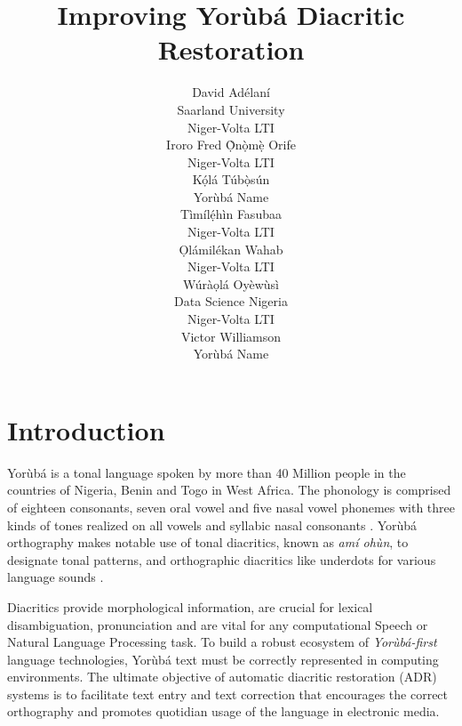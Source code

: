 \documentclass{article} %
\title{Improving Yor{\`u}b{\'a} Diacritic Restoration}
\author{David Ad{\'e}lan{\'i} \\
Saarland University\\
Niger-Volta LTI \\
\And
Iroro Fred \d{\`O}n\d{\`o}m\d{\`e} Orife \\
Niger-Volta LTI\\
\And
K\d{\'{o}}l\'{a} T\'{u}b\d{\`{o}}s\'{u}n \\
Yor{\`u}b{\'a} Name \\
\And
T{\`i}m{\'i}l\d{\'{e}}h{\`i}n Fasubaa \\
Niger-Volta LTI \\
\And
\d{O}l{\'a}mil{\'e}kan Wahab \\
Niger-Volta LTI \\
\And
W{\'u}r{\`a}\d{o}l{\'a} Oy{\`e}w{\`u}s{\`i} \\
Data Science Nigeria \\
Niger-Volta LTI \\
\And
Victor Williamson \\
Yor{\`u}b{\'a} Name \\
}
\begin{document}
\maketitle


\section{Introduction}\label{sec:introduction}

Yor{\`u}b{\'a} is a tonal language spoken by more than 40 Million people in the countries of Nigeria, Benin and Togo in West Africa. The phonology is comprised of eighteen consonants, seven oral vowel and five nasal vowel phonemes with three kinds of tones realized on all vowels and syllabic nasal consonants \citep{akinlabi2004sound}. Yor{\`u}b{\'a} orthography makes notable use of tonal diacritics, known as \emph{am{\'i} oh{\`u}n}, to designate tonal patterns, and orthographic diacritics like underdots for various language sounds \citep{adegbola2012quantifying, wells2000orthographic}.

Diacritics provide morphological information, are crucial for lexical disambiguation, pronunciation and are vital for any computational Speech or Natural Language Processing  task. To build a robust ecosystem of \emph{Yor{\`u}b{\'a}-first} language technologies, Yor{\`u}b{\'a} text must be correctly represented in computing environments. The ultimate objective of automatic diacritic restoration (ADR) systems is to facilitate text entry and text correction that encourages the correct orthography and promotes quotidian usage of the language in electronic media.
\end{document}

